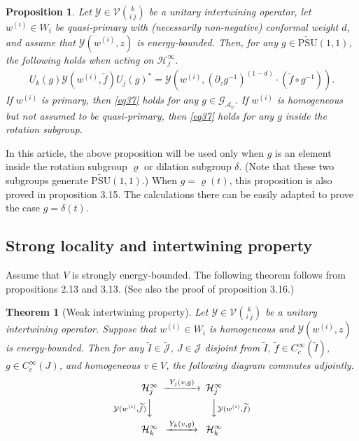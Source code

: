 \documentclass[12pt,a4paper]{article}
\theoremstyle{definition}
\theoremstyle{plain}
\newtheorem{thm}[df]{Theorem}
\newtheorem{pp}[df]{Proposition}
\newcommand{\mc}{\mathcal}
\newcommand{\wtd}{\widetilde}
\newcommand{\UPSU}{\widetilde{\mathrm{PSU}}(1,1)}
\newcommand{\GAV}{\mathscr G_{\mathcal A_V}}
\newcommand{\Jtd}{\widetilde{\mathcal J}}
\numberwithin{equation}{subsection}
\begin{document}
\begin{pp}\label{lb44}
Let $\mc Y\in\mc V{k\choose i~j}$ be a unitary intertwining operator, let $w^{(i)}\in W_i$ be quasi-primary with (necessarily non-negative) conformal weight $d$, and assume that $\mc Y(w^{(i)},z)$ is energy-bounded.  Then, for any $g\in\UPSU$, the following holds when acting on $\mc H_j^\infty$.
\begin{align}
U_k(g)\mc Y(w^{(i)},\wtd f)U_j(g)^*=\mc Y(w^{(i)},(\partial_zg^{-1})^{(1-d)}\cdot (\wtd f\circ g^{-1})).\label{eq37}
\end{align}
If $w^{(i)}$ is primary, then \eqref{eq37} holds for any $g\in\GAV$. If $w^{(i)}$ is homogeneous but not assumed to be quasi-primary, then \eqref{eq37} holds for any $g$ inside the rotation subgroup. 
\end{pp}
In this article, the above proposition will be used only when $g$ is an element inside the rotation subgroup $\varrho$ or dilation subgroup $\delta$. (Note that these two subgroups generate $\UPSU$.) When $g=\varrho(t)$, this proposition is also proved in \cite{Gui19a} proposition 3.15. The calculations there can be easily adapted to prove the case $g=\delta(t)$.






\subsection{Strong locality and intertwining property}\label{lb67}

Assume that  $V$ is strongly energy-bounded. The following theorem follows from \cite{Gui19a} propositions 2.13 and 3.13. (See also the proof of \cite{Gui19a} proposition 3.16.)

\begin{thm}[Weak intertwining property]\label{lb63}
Let $\mc Y\in\mc V{k\choose i~j}$ be a unitary intertwining operator. Suppose that $w^{(i)}\in W_i$ is homogeneous and $\mc Y(w^{(i)},z)$ is energy-bounded. Then for any $\wtd I\in\Jtd$, $J\in\mc J$ disjoint from $\wtd I$, $\wtd f\in C_c^\infty(\wtd I)$, $g\in C_c^\infty(J)$, and homogeneous $v\in V$, the following diagram commutes adjointly.
\begin{align}\label{eq38}
\begin{CD}
\mc H_j^\infty @>~Y_j(v,g)~>> \mc H_j^\infty\\
@V \mc Y(w^{(i)},\wtd f)  VV @VV \mc Y(w^{(i)},\wtd f) V\\
\mc H_k^\infty @> Y_k(v,g)>> \mc H_k^\infty
\end{CD}
\end{align}	
\end{thm}
\end{document}
